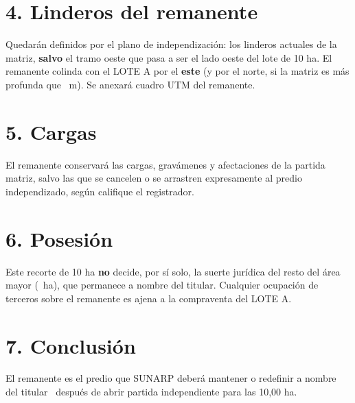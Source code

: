 \documentclass[12pt,a4paper]{article}
\begin{document}
\section*{4. Linderos del remanente}
Quedarán definidos por el plano de independización: los linderos actuales de la matriz, \textbf{salvo} el tramo oeste que pasa a ser el lado oeste del lote de 10 ha. El remanente colinda con el LOTE A por el \textbf{este} (y por el norte, si la matriz es más profunda que \FondoM\ m). Se anexará cuadro UTM del remanente.

\section*{5. Cargas}
El remanente conservará las cargas, gravámenes y afectaciones de la partida matriz, salvo las que se cancelen o se arrastren expresamente al predio independizado, según califique el registrador.

\section*{6. Posesión}
Este recorte de 10 ha \textbf{no} decide, por sí solo, la suerte jurídica del resto del área mayor (\AreaRemanenteHa\ ha), que permanece a nombre del titular. Cualquier ocupación de terceros sobre el remanente es ajena a la compraventa del LOTE A.

\section*{7. Conclusión}
El remanente es el predio que SUNARP deberá mantener o redefinir a nombre del titular \VendedorNombreCompleto\ después de abrir partida independiente para las 10,00 ha.

\LugarFecha
\noindent
{}
\hfill
{}
\end{document}

